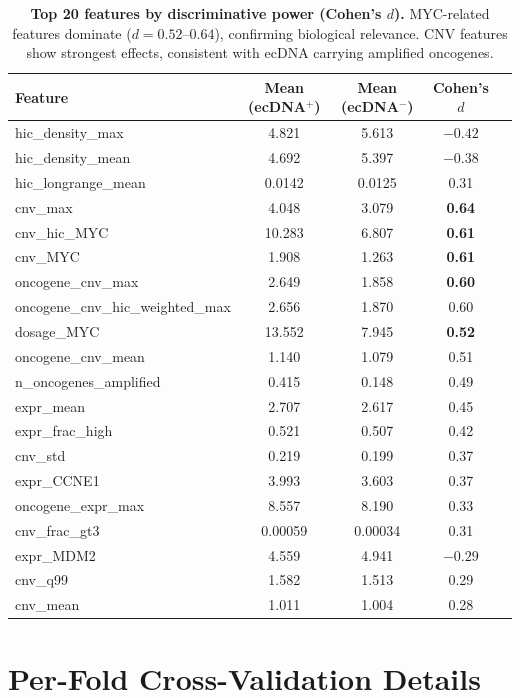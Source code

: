 \documentclass{article}
\begin{document}
\begin{table}[H]
\caption{\textbf{Top 20 features by discriminative power (Cohen's $d$).} MYC-related features dominate ($d = 0.52$--$0.64$), confirming biological relevance. CNV features show strongest effects, consistent with ecDNA carrying amplified oncogenes.}
\label{tab:feature_effects}
\centering
\small
\begin{tabular}{@{}lcccc@{}}
\toprule
Feature & Mean (ecDNA$^+$) & Mean (ecDNA$^-$) & Cohen's $d$ \\
\midrule
hic\_density\_max & 4.821 & 5.613 & $-0.42$ \\
hic\_density\_mean & 4.692 & 5.397 & $-0.38$ \\
hic\_longrange\_mean & 0.0142 & 0.0125 & 0.31 \\
cnv\_max & 4.048 & 3.079 & \textbf{0.64} \\
cnv\_hic\_MYC & 10.283 & 6.807 & \textbf{0.61} \\
cnv\_MYC & 1.908 & 1.263 & \textbf{0.61} \\
oncogene\_cnv\_max & 2.649 & 1.858 & \textbf{0.60} \\
oncogene\_cnv\_hic\_weighted\_max & 2.656 & 1.870 & 0.60 \\
dosage\_MYC & 13.552 & 7.945 & \textbf{0.52} \\
oncogene\_cnv\_mean & 1.140 & 1.079 & 0.51 \\
n\_oncogenes\_amplified & 0.415 & 0.148 & 0.49 \\
expr\_mean & 2.707 & 2.617 & 0.45 \\
expr\_frac\_high & 0.521 & 0.507 & 0.42 \\
cnv\_std & 0.219 & 0.199 & 0.37 \\
expr\_CCNE1 & 3.993 & 3.603 & 0.37 \\
oncogene\_expr\_max & 8.557 & 8.190 & 0.33 \\
cnv\_frac\_gt3 & 0.00059 & 0.00034 & 0.31 \\
expr\_MDM2 & 4.559 & 4.941 & $-0.29$ \\
cnv\_q99 & 1.582 & 1.513 & 0.29 \\
cnv\_mean & 1.011 & 1.004 & 0.28 \\
\bottomrule
\end{tabular}
\end{table}


\section{Per-Fold Cross-Validation Details}
\label{app:perfold}
\end{document}
